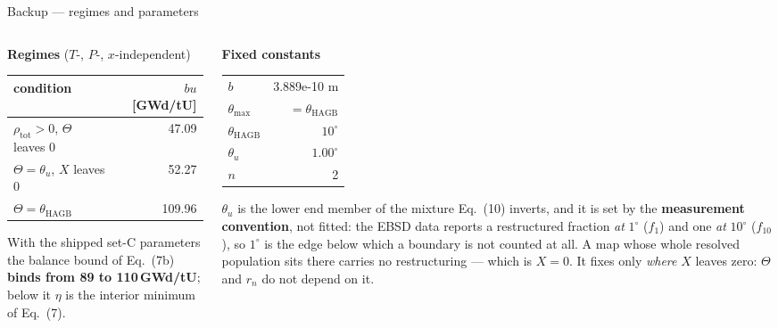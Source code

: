 \documentclass[10pt,aspectratio=169]{beamer}
\begin{document}
\begin{frame}{Backup --- regimes and parameters}
  \begin{columns}[T]
    \begin{column}{0.5\textwidth}
      \textbf{Regimes} ($T$-, $P$-, $x$-independent)
      \small
      \begin{tabular}{lr}
        \toprule
        condition & $bu$ [GWd/tU] \\
        \midrule
        $\rho_{\text{tot}} > 0$, $\Theta$ leaves 0 & 47.09 \\
        $\Theta = \theta_u$, $X$ leaves 0 & 52.27 \\
        $\Theta = \theta_{\text{HAGB}}$   & 109.96 \\
        \bottomrule
      \end{tabular}

      \vspace{0.8em}
      With the shipped set-C parameters the balance bound of Eq.~(7b) \textbf{binds from 89 to 110\,GWd/tU}; below it $\eta$ is the interior minimum of Eq.~(7).
    \end{column}
    \begin{column}{0.5\textwidth}
      \textbf{Fixed constants}
      \small
      \begin{tabular}{lr}
        \toprule
        $b$ & 3.889e-10 m \\
        $\theta_{\max}$ & $= \theta_{\text{HAGB}}$ \\
        $\theta_{\text{HAGB}}$ & $10^\circ$ \\
        $\theta_u$ & $1.00^\circ$ \\
        $n$ & 2 \\
        \bottomrule
      \end{tabular}

      \vspace{0.6em}
      \footnotesize
      $\theta_u$ is the lower end member of the mixture Eq.~(10) inverts, and it is set by
      the \textbf{measurement convention}, not fitted: the EBSD data reports a restructured
      fraction \emph{at} $1^\circ$ ($f_1$) and one \emph{at} $10^\circ$ ($f_{10}$), so
      $1^\circ$ is the edge below which a boundary is not counted at all. A map whose whole
      resolved population sits there carries no restructuring --- which is $X = 0$.
      It fixes only \emph{where} $X$ leaves zero: $\Theta$ and $r_n$ do not depend on it.
    \end{column}
  \end{columns}
\end{frame}
\end{document}
